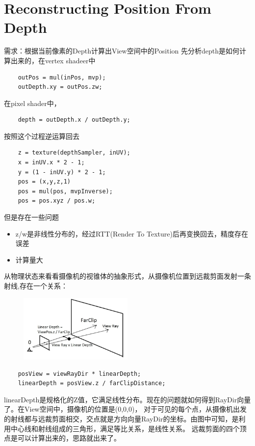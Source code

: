 \section{Reconstructing Position From Depth}
需求：根据当前像素的Depth计算出View空间中的Position
先分析depth是如何计算出来的，在vertex shadeer中
\begin{lstlisting}
    outPos = mul(inPos, mvp);
    outDepth.xy = outPos.zw;
\end{lstlisting}
在pixel shader中，
\begin{lstlisting}
    depth = outDepth.x / outDepth.y;
\end{lstlisting}
按照这个过程逆运算回去
\begin{lstlisting}
    z = texture(depthSampler, inUV);
    x = inUV.x * 2 - 1;
    y = (1 - inUV.y) * 2 - 1;
    pos = (x,y,z,1)
    pos = mul(pos, mvpInverse);
    pos = pos.xyz / pos.w;
\end{lstlisting}
但是存在一些问题
\begin{itemize}
    \item {z/w是非线性分布的，经过RTT(Render To Texture)后再变换回去，精度存在误差}
    \item {计算量大}
\end{itemize}
从物理状态来看看摄像机的视锥体的抽象形式，从摄像机位置到远裁剪面发射一条射线,存在一个关系：

\begin{figure}[h]
    \centering
    \includegraphics[width=0.5\textwidth]{images/reconstructing-position-from-depth.png}
\end{figure}

\begin{lstlisting}
    posView = viewRayDir * linearDepth;    
    linearDepth = posView.z / farClipDistance;
\end{lstlisting}

linearDepth是规格化的Z值，它满足线性分布。现在的问题就如何得到RayDir向量了。在View空间中，摄像机的位置是(0,0,0)，
对于可见的每个点，从摄像机出发的射线都与远裁剪面相交，交点就是方向向量RayDir的坐标。由图中可知，是利用中心线和射线组成的三角形，满足等比关系，是线性关系。
远裁剪面的四个顶点是可以计算出来的，思路就出来了。

